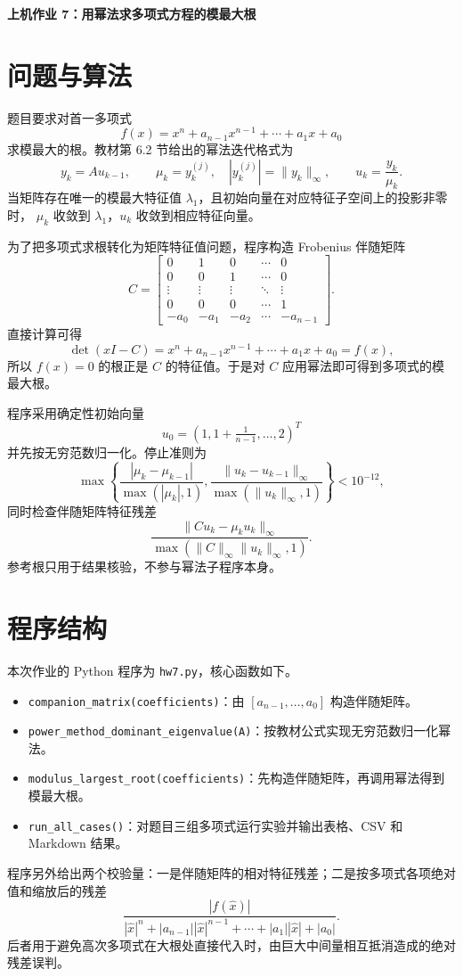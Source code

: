 \documentclass[a4paper,11pt]{article}
\begin{document}
\begin{center}
    \Large\textbf{上机作业 7：用幂法求多项式方程的模最大根}
\end{center}

\section{问题与算法}
题目要求对首一多项式
\[
    f(x)=x^n+a_{n-1}x^{n-1}+\cdots+a_1x+a_0
\]
求模最大的根。教材第 6.2 节给出的幂法迭代格式为
\[
    y_k=Au_{k-1},\qquad
    \mu_k=y_k^{(j)},\quad |y_k^{(j)}|=\|y_k\|_\infty,\qquad
    u_k=\frac{y_k}{\mu_k}.
\]
当矩阵存在唯一的模最大特征值 $\lambda_1$，且初始向量在对应特征子空间上的投影非零时，
$\mu_k$ 收敛到 $\lambda_1$，$u_k$ 收敛到相应特征向量。

为了把多项式求根转化为矩阵特征值问题，程序构造 Frobenius 伴随矩阵
\[
    C=
    \begin{bmatrix}
    0&1&0&\cdots&0\\
    0&0&1&\cdots&0\\
    \vdots&\vdots&\vdots&\ddots&\vdots\\
    0&0&0&\cdots&1\\
    -a_0&-a_1&-a_2&\cdots&-a_{n-1}
    \end{bmatrix}.
\]
直接计算可得
\[
    \det(xI-C)=x^n+a_{n-1}x^{n-1}+\cdots+a_1x+a_0=f(x),
\]
所以 $f(x)=0$ 的根正是 $C$ 的特征值。于是对 $C$ 应用幂法即可得到多项式的模最大根。

程序采用确定性初始向量
\[
    u_0=(1,1+\tfrac1{n-1},\ldots,2)^T
\]
并先按无穷范数归一化。停止准则为
\[
    \max\left\{
    \frac{|\mu_k-\mu_{k-1}|}{\max(|\mu_k|,1)},
    \frac{\|u_k-u_{k-1}\|_\infty}{\max(\|u_k\|_\infty,1)}
    \right\}<10^{-12},
\]
同时检查伴随矩阵特征残差
\[
    \frac{\|Cu_k-\mu_k u_k\|_\infty}
    {\max(\|C\|_\infty\|u_k\|_\infty,1)}.
\]
参考根只用于结果核验，不参与幂法子程序本身。

\section{程序结构}
本次作业的 Python 程序为 \verb|hw7.py|，核心函数如下。
\begin{itemize}
    \item \verb|companion_matrix(coefficients)|：由 $[a_{n-1},\ldots,a_0]$ 构造伴随矩阵。
    \item \verb|power_method_dominant_eigenvalue(A)|：按教材公式实现无穷范数归一化幂法。
    \item \verb|modulus_largest_root(coefficients)|：先构造伴随矩阵，再调用幂法得到模最大根。
    \item \verb|run_all_cases()|：对题目三组多项式运行实验并输出表格、CSV 和 Markdown 结果。
\end{itemize}
程序另外给出两个校验量：一是伴随矩阵的相对特征残差；二是按多项式各项绝对值和缩放后的残差
\[
    \frac{|f(\hat x)|}
    {|\hat x|^n+|a_{n-1}||\hat x|^{n-1}+\cdots+|a_1||\hat x|+|a_0|}.
\]
后者用于避免高次多项式在大根处直接代入时，由巨大中间量相互抵消造成的绝对残差误判。
\end{document}
